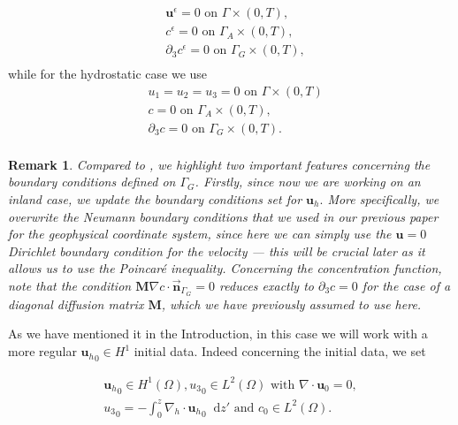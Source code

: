 \documentclass[11pt, a4paper]{article}
\newtheorem{remark}{Remark}
\newcommand*\diff{\mathop{}\!\mathrm{d}}
\begin{document}
%
\begin{equation} \label{ANSC_bc-weak}
\begin{split}
& \mathbf{u}^\epsilon = 0 \text{ on } \Gamma \times (0,T), \\
& c^\epsilon = 0 \text{ on } \Gamma_A \times (0,T), \\
& \partial_3 c^\epsilon = 0 \text{ on } \Gamma_G \times (0,T), \\
\end{split}
\end{equation}
while for the hydrostatic case we use
%
\begin{equation} \label{HNSC_bc-weak}
\begin{split} 
& u_1 = u_2 = u_3 = 0 \text{ on } \Gamma \times (0,T) \\
& c = 0 \text{ on } \Gamma_A \times (0,T), \\
& \partial_3 c = 0 \text{ on } \Gamma_G \times (0,T). \\
\end{split}
\end{equation}

\begin{remark}
Compared to \cite{pollatmws2019}, we highlight two important features concerning the boundary conditions defined on $\Gamma_G$. Firstly, since now we are working on an inland case, we update the boundary conditions set for $\mathbf{u}_h.$ More specifically, we overwrite the Neumann boundary conditions that we used in our previous paper for the geophysical coordinate system, since here we can simply use the $\mathbf{u}=0$ Dirichlet boundary condition for the velocity --- this will be crucial later as it allows us to use the Poincar\'e inequality. Concerning the concentration function, note that the condition $\mathbf{M} \nabla c \cdot \vec{\boldsymbol{n}}_{\Gamma_G} = 0$ reduces exactly to $\partial_3 c = 0$ for the case of a diagonal diffusion matrix $\mathbf{M}$, which we have previously assumed to use here.
\end{remark}

As we have mentioned it in the Introduction, in this case we will work with a more regular ${\mathbf{u}_h}_0 \in H^1$ initial data. Indeed concerning the initial data, we set

\begin{equation}
\begin{gathered}\label{DWMC_weak_initial_data_regularities}
{\mathbf{u}_h}_0 \in H^1 (\Omega), {u_3}_0 \in L^2(\Omega) \text{ with } \nabla \cdot \mathbf{u}_0 = 0,\\
{u_3}_0 = - \int_0^z \nabla_h \cdot {\mathbf{u}_h}_0 \diff z' \text{ and } c_0 \in L^2 (\Omega).
\end{gathered}
\end{equation}
\end{document}
